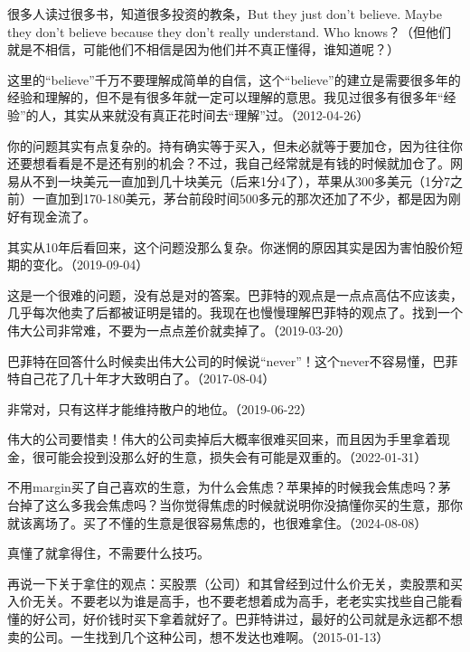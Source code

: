很多人读过很多书，知道很多投资的教条，But they just don't believe. Maybe they don't believe because they don't really understand. Who knows？（但他们就是不相信，可能他们不相信是因为他们并不真正懂得，谁知道呢？）

这里的“believe”千万不要理解成简单的自信，这个“believe”的建立是需要很多年的经验和理解的，但不是有很多年就一定可以理解的意思。我见过很多有很多年“经验”的人，其实从来就没有真正花时间去“理解”过。（2012-04-26）


你的问题其实有点复杂的。持有确实等于买入，但未必就等于要加仓，因为往往你还要想看看是不是还有别的机会？不过，我自己经常就是有钱的时候就加仓了。网易从不到一块美元一直加到几十块美元（后来1分4了），苹果从300多美元（1分7之前）一直加到170-180美元，茅台前段时间500多元的那次还加了不少，都是因为刚好有现金流了。

其实从10年后看回来，这个问题没那么复杂。你迷惘的原因其实是因为害怕股价短期的变化。（2019-09-04）


这是一个很难的问题，没有总是对的答案。巴菲特的观点是一点点高估不应该卖，几乎每次他卖了后都被证明是错的。我现在也慢慢理解巴菲特的观点了。找到一个伟大公司非常难，不要为一点点差价就卖掉了。（2019-03-20）

巴菲特在回答什么时候卖出伟大公司的时候说“never”！这个never不容易懂，巴菲特自己花了几十年才大致明白了。（2017-08-04）


非常对，只有这样才能维持散户的地位。（2019-06-22）

伟大的公司要惜卖！伟大的公司卖掉后大概率很难买回来，而且因为手里拿着现金，很可能会投到没那么好的生意，损失会有可能是双重的。（2022-01-31）


不用margin买了自己喜欢的生意，为什么会焦虑？苹果掉的时候我会焦虑吗？茅台掉了这么多我会焦虑吗？当你觉得焦虑的时候就说明你没搞懂你买的生意，那你就该离场了。买了不懂的生意是很容易焦虑的，也很难拿住。（2024-08-08）

真懂了就拿得住，不需要什么技巧。

再说一下关于拿住的观点：买股票（公司）和其曾经到过什么价无关，卖股票和买入价无关。不要老以为谁是高手，也不要老想着成为高手，老老实实找些自己能看懂的好公司，好价钱时买下拿着就好了。巴菲特讲过，最好的公司就是永远都不想卖的公司。一生找到几个这种公司，想不发达也难啊。（2015-01-13）

